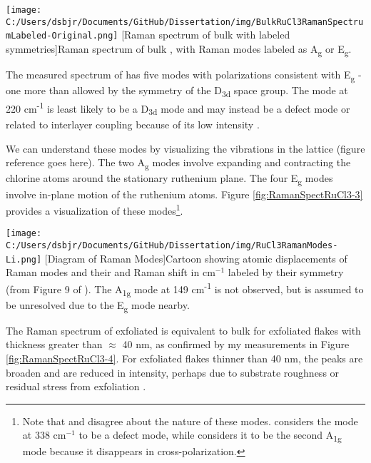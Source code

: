 \begin{centering}
\texttt{[image: C:/Users/dsbjr/Documents/GitHub/Dissertation/img/BulkRuCl3RamanSpectrumLabeled-Original.png]}
  \captionsetup{width=0.75\textwidth}
  [Raman spectrum of bulk \ruclnospace with labeled symmetries]{Raman spectrum of bulk \ruclnospace, with Raman modes labeled as A\textsubscript{g} or E\textsubscript{g}.}
  \label{fig:RamanSpectRuCl3-2}
\end{centering}

The measured spectrum of \rucl has five modes with polarizations consistent with E\textsubscript{g} - one more than allowed by the symmetry of the D\textsubscript{3d} space group. The mode at 220 cm\textsuperscript{-1} is least likely to be a D\textsubscript{3d} mode and may instead be a defect mode or related to interlayer coupling because of its low intensity \cite{Sandilands2015}.

We can understand these modes by visualizing the vibrations in the lattice (figure reference goes here). The two A\textsubscript{g} modes involve expanding and contracting the chlorine atoms around the stationary ruthenium plane. The four E\textsubscript{g} modes involve in-plane motion of the ruthenium atoms. Figure \ref{fig:RamanSpectRuCl3-3} provides a visualization of these modes\footnote{Note that \cite{Li2019} and \cite{Sandilands2015} disagree about the nature of these modes. \cite{Li2019} considers the mode at 338 cm$^{-1}$ to be a defect mode, while \cite{Sandilands2015} considers it to be the second A\textsubscript{1g} mode because it disappears in cross-polarization.}.

\begin{centering}
\texttt{[image: C:/Users/dsbjr/Documents/GitHub/Dissertation/img/RuCl3RamanModes-Li.png]}
  \captionsetup{width=0.75\textwidth}
  [Diagram of \rucl Raman Modes]{Cartoon showing atomic displacements of Raman modes and their and Raman shift in cm$^{-1}$ labeled by their symmetry (from Figure 9 of \cite{Li2019}). The A\textsubscript{1g} mode at 149 cm\textsuperscript{-1} is not observed, but is assumed to be unresolved due to the E\textsubscript{g} mode nearby.}
  \label{fig:RamanSpectRuCl3-3}
\end{centering}

The Raman spectrum of exfoliated \rucl is equivalent to bulk \rucl for exfoliated flakes with thickness greater than $\approx$ 40 nm, as confirmed by my measurements in Figure \ref{fig:RamanSpectRuCl3-4}. For exfoliated flakes thinner than 40 nm, the peaks are broaden and are reduced in intensity, perhaps due to substrate roughness or residual stress from exfoliation \cite{Zhou2018}.

